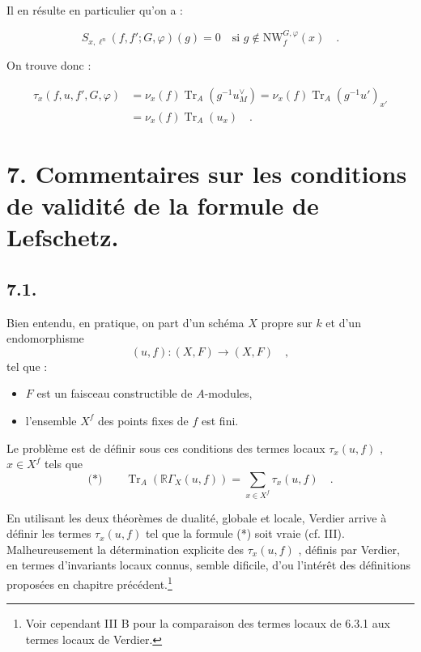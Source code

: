 \documentclass[11pt]{article}
\newcommand{\R}{\mathbb{R}}\newcommand{\RHomCore}{\mathbb{R}\mathrm{Hom}}
\providecommand{\Tr}{\operatorname{Tr}}
\providecommand{\Tr}{\operatorname{Tr}}
\providecommand{\Tr}{\operatorname{Tr}}
\providecommand{\R}{\mathrm R}
\providecommand{\Tr}{\operatorname{Tr}}
\providecommand{\Tr}{\operatorname{Tr}}
\begin{document}
Il en résulte en particulier qu'on a :

\begin{equation}\tag{6.4.8}
S_{x,\ell^n}(f, f'; G, \varphi)(g) = 0 \quad \text{si } g \notin \mathrm{NW}_{f}^{G,\varphi}(x) \quad .
\end{equation}

On trouve donc :

\begin{equation}\tag{6.4.9}
\begin{aligned}
\tau_x(f,u, f', G, \varphi) &= \nu_x(f) \Tr_A(g^{-1}u_M^\vee) = \nu_x(f) \Tr_A(g^{-1}u')_{x'} \\
&= \nu_x(f) \Tr_A(u_x) \quad .
\end{aligned}
\end{equation}

\section*{7. Commentaires sur les conditions de validité de la formule de Lefschetz.}

\subsection*{7.1.}
Bien entendu, en pratique, on part d'un schéma $X$ propre sur $k$ et d'un endomorphisme
\[
(u, f) : (X, F) \longrightarrow (X, F) \quad ,
\]
tel que :
\begin{itemize}[label=-]
\item $F$ est un faisceau constructible de $A$-modules,
\item l'ensemble $X^f$ des points fixes de $f$ est fini.
\end{itemize}

Le problème est de définir sous ces conditions des termes locaux $\tau_x(u, f)$ , $x \in X^f$ tels que
\[
\text{(*)} \qquad \Tr_A(\R\Gamma_X(u, f)) = \sum_{x \in X^f} \tau_x(u, f) \quad .
\]

En utilisant les deux théorèmes de dualité, globale et locale, Verdier arrive à définir les termes $\tau_x(u, f)$ tel que la formule (*) soit vraie (cf. III). Malheureusement la détermination explicite des $\tau_x(u, f)$ , définis par Verdier, en termes d'invariants locaux connus, semble dificile, d'ou l'intérêt des définitions proposées en chapitre précédent.\footnote{Voir cependant III B pour la comparaison des termes locaux de 6.3.1 aux termes locaux de Verdier.}
\end{document}
